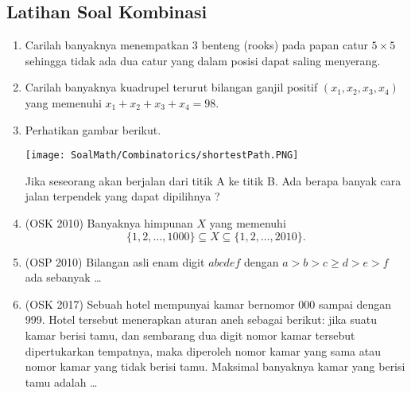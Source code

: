 \subsection{Latihan Soal Kombinasi}
\begin{enumerate}   
    \item  Carilah banyaknya menempatkan 3 benteng (rooks) pada papan catur $5 \times 5$ sehingga tidak ada dua catur yang dalam posisi dapat saling menyerang.

    \item Carilah banyaknya kuadrupel terurut bilangan ganjil positif $(x_1, x_2, x_3, x_4)$ yang memenuhi $x_1 + x_2 + x_3 + x_4 = 98$.

    \item Perhatikan gambar berikut. 
    
    \texttt{[image: SoalMath/Combinatorics/shortestPath.PNG]} 
    
    Jika seseorang akan berjalan dari titik A ke titik B. Ada berapa banyak cara jalan terpendek yang dapat dipilihnya ?

    \item (OSK 2010) Banyaknya himpunan $X$ yang memenuhi 
    $$\{1,2,\dots,1000\} \subseteq X \subseteq \{1,2,\dots,2010\}.$$

    \item (OSP 2010) Bilangan asli enam digit $abcdef$ dengan $a > b > c \ge d > e > f$ ada sebanyak \dots
    
    \item (OSK 2017)
	Sebuah hotel mempunyai kamar bernomor 000 sampai dengan 999. Hotel tersebut menerapkan aturan aneh sebagai berikut: jika suatu kamar berisi tamu, dan sembarang dua digit nomor kamar tersebut dipertukarkan tempatnya, maka diperoleh nomor kamar yang sama atau nomor kamar yang tidak berisi tamu. Maksimal banyaknya kamar yang berisi tamu adalah \dots
\end{enumerate}
